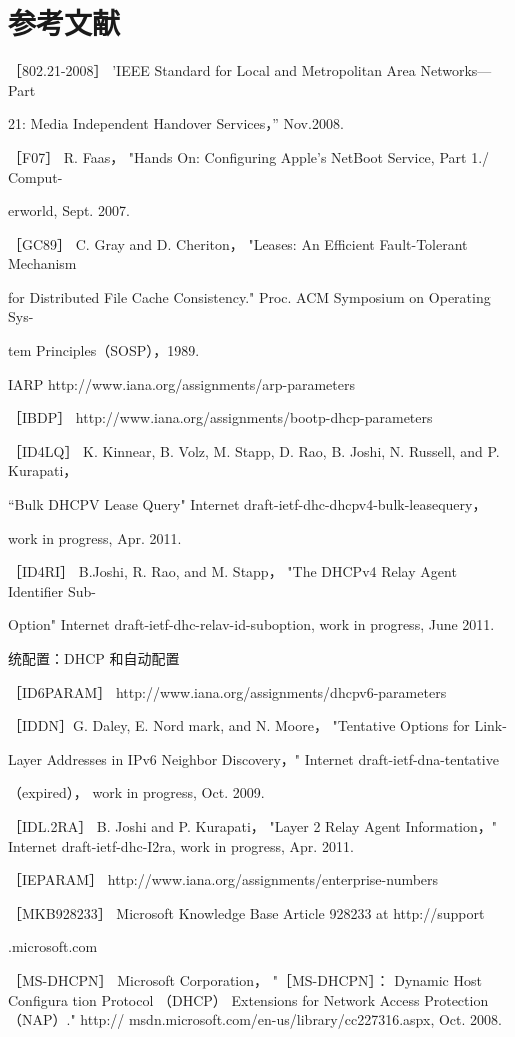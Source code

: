 \section{参考文献}

［802.21-2008］ 'IEEE Standard for Local and Metropolitan Area Networks—Part

21: Media Independent Handover Services，” Nov.2008.

［F07］ R. Faas， "Hands On: Configuring Apple's NetBoot Service, Part 1./ Comput-

erworld, Sept. 2007.

［GC89］ C. Gray and D. Cheriton， "Leases: An Efficient Fault-Tolerant Mechanism

for Distributed File Cache Consistency." Proc. ACM Symposium on Operating Sys-

tem Principles（SOSP），1989.

IARP http://www.iana.org/assignments/arp-parameters

［IBDP］ http://www.iana.org/assignments/bootp-dhcp-parameters

［ID4LQ］ K. Kinnear, B. Volz, M. Stapp, D. Rao, B. Joshi, N. Russell, and P. Kurapati，

“Bulk DHCPV Lease Query" Internet draft-ietf-dhc-dhcpv4-bulk-leasequery，

work in progress, Apr. 2011.

［ID4RI］ B.Joshi, R. Rao, and M. Stapp， "The DHCPv4 Relay Agent Identifier Sub-

Option" Internet draft-ietf-dhc-relav-id-suboption, work in progress, June 2011.

统配置：DHCP 和自动配置

［ID6PARAM］ http://www.iana.org/assignments/dhcpv6-parameters

［IDDN］G. Daley, E. Nord mark, and N. Moore， "Tentative Options for Link-

Layer Addresses in IPv6 Neighbor Discovery，" Internet draft-ietf-dna-tentative

（expired）， work in progress, Oct. 2009.

［IDL.2RA］ B. Joshi and P. Kurapati， "Layer 2 Relay Agent Information，" Internet
draft-ietf-dhc-I2ra, work in progress, Apr. 2011.

［IEPARAM］ http://www.iana.org/assignments/enterprise-numbers

［MKB928233］ Microsoft Knowledge Base Article 928233 at http://support

.microsoft.com

［MS-DHCPN］ Microsoft Corporation， "［MS-DHCPN］： Dynamic Host Configura
tion Protocol （DHCP） Extensions for Network Access Protection （NAP）." http://
msdn.microsoft.com/en-us/library/cc227316.aspx, Oct. 2008.